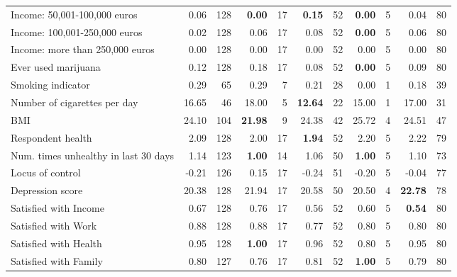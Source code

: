 \begin{tabular}{l r r r r r r r r r r}
Income: 50,001-100,000 euros &      0.06 &       128 & \textbf{     0.00} &        17 & \textbf{     0.15} &        52 & \textbf{     0.00} &         5 &      0.04 &        80 \\
Income: 100,001-250,000 euros &      0.02 &       128 &      0.06 &        17 &      0.08 &        52 & \textbf{     0.00} &         5 &      0.06 &        80 \\
Income: more than 250,000 euros &      0.00 &       128 &      0.00 &        17 &      0.00 &        52 &      0.00 &         5 &      0.00 &        80 \\
Ever used marijuana &      0.12 &       128 &      0.18 &        17 &      0.08 &        52 & \textbf{     0.00} &         5 &      0.09 &        80 \\
Smoking indicator &      0.29 &        65 &      0.29 &         7 &      0.21 &        28 &      0.00 &         1 &      0.18 &        39 \\
Number of cigarettes per day &     16.65 &        46 &     18.00 &         5 & \textbf{    12.64} &        22 &     15.00 &         1 &     17.00 &        31 \\
BMI &     24.10 &       104 & \textbf{    21.98} &         9 &     24.38 &        42 &     25.72 &         4 &     24.51 &        47 \\
Respondent health &      2.09 &       128 &      2.00 &        17 & \textbf{     1.94} &        52 &      2.20 &         5 &      2.22 &        79 \\
Num. times unhealthy in last 30 days &      1.14 &       123 & \textbf{     1.00} &        14 &      1.06 &        50 & \textbf{     1.00} &         5 &      1.10 &        73 \\
Locus of control &     -0.21 &       126 &      0.15 &        17 &     -0.24 &        51 &     -0.20 &         5 &     -0.04 &        77 \\
Depression score &     20.38 &       128 &     21.94 &        17 &     20.58 &        50 &     20.50 &         4 & \textbf{    22.78} &        78 \\
Satisfied with Income &      0.67 &       128 &      0.76 &        17 &      0.56 &        52 &      0.60 &         5 & \textbf{     0.54} &        80 \\
Satisfied with Work &      0.88 &       128 &      0.88 &        17 &      0.77 &        52 &      0.80 &         5 &      0.80 &        80 \\
Satisfied with Health &      0.95 &       128 & \textbf{     1.00} &        17 &      0.96 &        52 &      0.80 &         5 &      0.95 &        80 \\
Satisfied with Family &      0.80 &       127 &      0.76 &        17 &      0.81 &        52 & \textbf{     1.00} &         5 &      0.79 &        80 \\
\bottomrule
\end{tabular}
